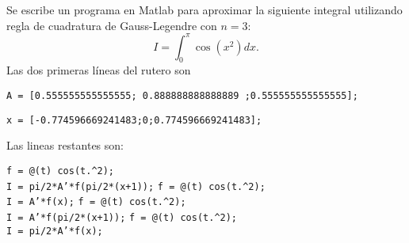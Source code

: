 \begin{pregunta}
\begin{cuerpo}
Se escribe un programa en Matlab para aproximar la siguiente integral utilizando regla de cuadratura de Gauss-Legendre con $n=3$:
$$
I=\int_0^\pi \cos(x^2) dx.
$$
Las dos primeras l\'ineas del rutero son

\hspace{1cm}
\texttt{A = [0.555555555555555; 0.888888888888889 ;0.555555555555555];}

\hspace{1cm}
\texttt{x = [-0.774596669241483;0;0.774596669241483];}

Las lineas restantes son:
\end{cuerpo}

\begin{multicols}{2}
\begin{alternativas}
{\texttt{f = @(t) cos(t.\^{}2);}\\
\texttt{I = pi/2*A'*f(pi/2*(x+1));}} %
{\texttt{f = @(t) cos(t.\^{}2);}\\
\texttt{I = A'*f(x);}} 
{\texttt{f = @(t) cos(t.\^{}2);}\\
\texttt{I = A'*f(pi/2*(x+1));}} 
{\texttt{f = @(t) cos(t.\^{}2);}\\
\texttt{I = pi/2*A'*f(x);}}
\end{alternativas}
\end{multicols}
\justificacion{7cm}
\end{pregunta}
